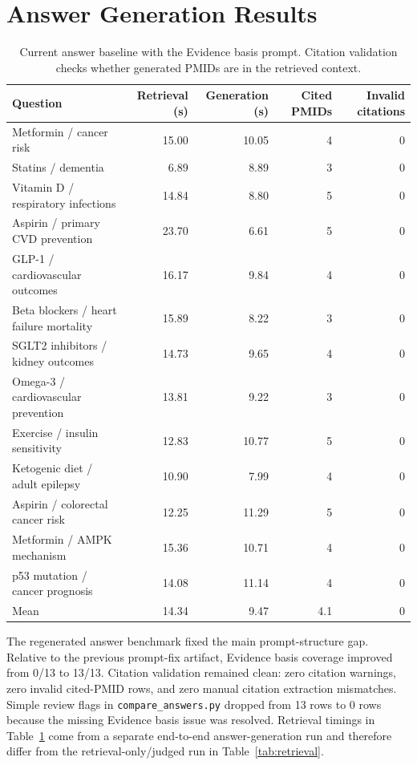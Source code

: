 \documentclass{article}
\begin{document}
\section{Answer Generation Results}

\begin{table}[t]
\centering
\caption{Current answer baseline with the Evidence basis prompt. Citation validation checks whether generated PMIDs are in the retrieved context.}
\label{tab:answers}
\begin{tabular}{lrrrr}
\toprule
Question & Retrieval (s) & Generation (s) & Cited PMIDs & Invalid citations \\
\midrule
Metformin / cancer risk & 15.00 & 10.05 & 4 & 0 \\
Statins / dementia & 6.89 & 8.89 & 3 & 0 \\
Vitamin D / respiratory infections & 14.84 & 8.80 & 5 & 0 \\
Aspirin / primary CVD prevention & 23.70 & 6.61 & 5 & 0 \\
GLP-1 / cardiovascular outcomes & 16.17 & 9.84 & 4 & 0 \\
Beta blockers / heart failure mortality & 15.89 & 8.22 & 3 & 0 \\
SGLT2 inhibitors / kidney outcomes & 14.73 & 9.65 & 4 & 0 \\
Omega-3 / cardiovascular prevention & 13.81 & 9.22 & 3 & 0 \\
Exercise / insulin sensitivity & 12.83 & 10.77 & 5 & 0 \\
Ketogenic diet / adult epilepsy & 10.90 & 7.99 & 4 & 0 \\
Aspirin / colorectal cancer risk & 12.25 & 11.29 & 5 & 0 \\
Metformin / AMPK mechanism & 15.36 & 10.71 & 4 & 0 \\
p53 mutation / cancer prognosis & 14.08 & 11.14 & 4 & 0 \\
\midrule
Mean & 14.34 & 9.47 & 4.1 & 0 \\
\bottomrule
\end{tabular}
\end{table}

The regenerated answer benchmark fixed the main prompt-structure gap. Relative to the previous prompt-fix artifact, Evidence basis coverage improved from 0/13 to 13/13. Citation validation remained clean: zero citation warnings, zero invalid cited-PMID rows, and zero manual citation extraction mismatches. Simple review flags in \texttt{compare\_answers.py} dropped from 13 rows to 0 rows because the missing Evidence basis issue was resolved. Retrieval timings in Table~\ref{tab:answers} come from a separate end-to-end answer-generation run and therefore differ from the retrieval-only/judged run in Table~\ref{tab:retrieval}.
\end{document}
